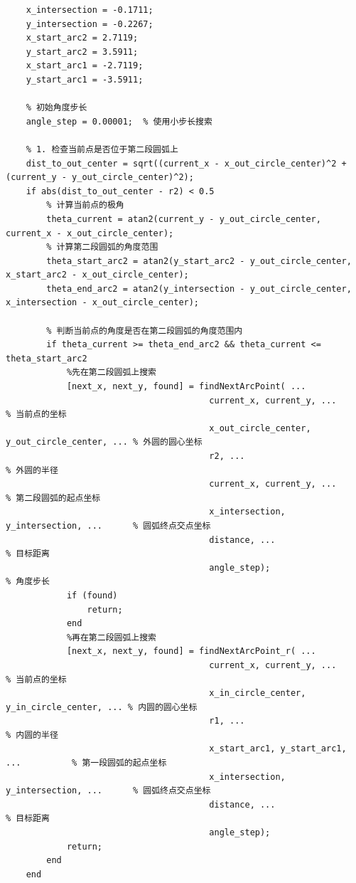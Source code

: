 \documentclass{cumcmthesis1}
\begin{document}
\begin{lstlisting}[caption={求解问题5的代码，将过程和结果打印到控制台上}, label={lst:tenth_code}]
    % 圆弧交点和圆弧与调头空间交点坐标
    x_intersection = -0.1711;
    y_intersection = -0.2267;
    x_start_arc2 = 2.7119;
    y_start_arc2 = 3.5911;
    x_start_arc1 = -2.7119;
    y_start_arc1 = -3.5911;

    % 初始角度步长
    angle_step = 0.00001;  % 使用小步长搜索
    
    % 1. 检查当前点是否位于第二段圆弧上
    dist_to_out_center = sqrt((current_x - x_out_circle_center)^2 + (current_y - y_out_circle_center)^2);
    if abs(dist_to_out_center - r2) < 0.5
        % 计算当前点的极角
        theta_current = atan2(current_y - y_out_circle_center, current_x - x_out_circle_center);
        % 计算第二段圆弧的角度范围
        theta_start_arc2 = atan2(y_start_arc2 - y_out_circle_center, x_start_arc2 - x_out_circle_center);
        theta_end_arc2 = atan2(y_intersection - y_out_circle_center, x_intersection - x_out_circle_center);

        % 判断当前点的角度是否在第二段圆弧的角度范围内
        if theta_current >= theta_end_arc2 && theta_current <= theta_start_arc2
            %先在第二段圆弧上搜索
            [next_x, next_y, found] = findNextArcPoint( ...
                                        current_x, current_y, ...                % 当前点的坐标
                                        x_out_circle_center, y_out_circle_center, ... % 外圆的圆心坐标
                                        r2, ...                                  % 外圆的半径
                                        current_x, current_y, ...          % 第二段圆弧的起点坐标
                                        x_intersection, y_intersection, ...      % 圆弧终点交点坐标
                                        distance, ...                            % 目标距离
                                        angle_step);                              % 角度步长
            if (found)
                return;
            end
            %再在第二段圆弧上搜索
            [next_x, next_y, found] = findNextArcPoint_r( ...
                                        current_x, current_y, ...                % 当前点的坐标
                                        x_in_circle_center, y_in_circle_center, ... % 内圆的圆心坐标
                                        r1, ...                                  % 内圆的半径
                                        x_start_arc1, y_start_arc1, ...          % 第一段圆弧的起点坐标
                                        x_intersection, y_intersection, ...      % 圆弧终点交点坐标
                                        distance, ...                            % 目标距离
                                        angle_step);
            return;
        end
    end
    

\end{lstlisting}
\end{document}
